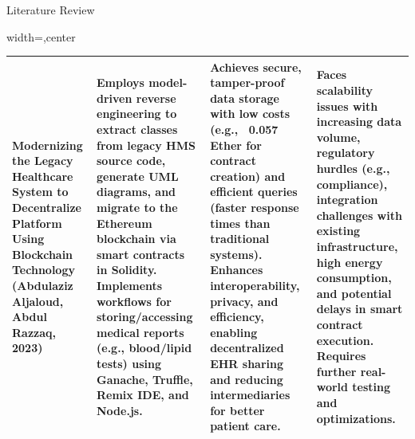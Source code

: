 \documentclass[10pt]{beamer}
\begin{document}
\begin{frame}{Literature Review}
\begin{adjustbox}{width=\textwidth,center}
\begin{tabular}{p{3cm}p{3cm}p{3cm}p{3cm}}
\midrule
Modernizing the Legacy Healthcare System to Decentralize Platform Using Blockchain Technology (Abdulaziz Aljaloud, Abdul Razzaq, 2023) & 
Employs model-driven reverse engineering to extract classes from legacy HMS source code, generate UML diagrams, and migrate to the Ethereum blockchain via smart contracts in Solidity. Implements workflows for storing/accessing medical reports (e.g., blood/lipid tests) using Ganache, Truffle, Remix IDE, and Node.js. & 
Achieves secure, tamper-proof data storage with low costs (e.g., ~0.057 Ether for contract creation) and efficient queries (faster response times than traditional systems). Enhances interoperability, privacy, and efficiency, enabling decentralized EHR sharing and reducing intermediaries for better patient care. & 
Faces scalability issues with increasing data volume, regulatory hurdles (e.g., compliance), integration challenges with existing infrastructure, high energy consumption, and potential delays in smart contract execution. Requires further real-world testing and optimizations. \\
\bottomrule
\end{tabular}
\end{adjustbox}
\end{frame}
\end{document}
